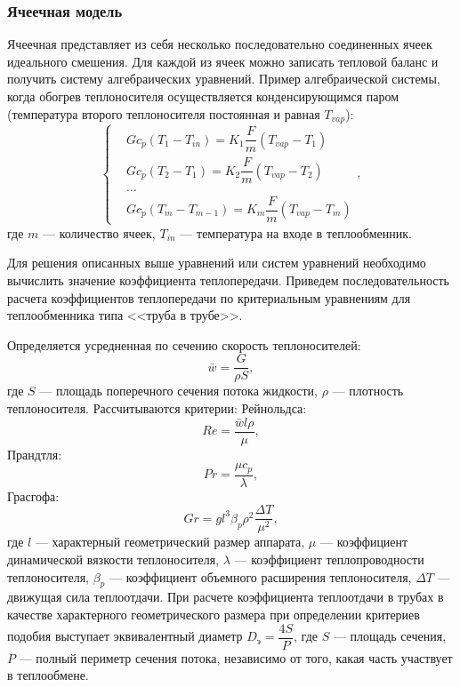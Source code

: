 \subsubsection*{Ячеечная модель}
Ячеечная представляет из себя несколько последовательно соединенных ячеек идеального смешения. Для каждой из ячеек можно записать тепловой баланс и получить систему алгебраических уравнений. Пример алгебраической системы, когда обогрев теплоносителя осуществляется конденсирующимся паром (температура второго теплоносителя постоянная и равная $T_{vap}$):
 \begin{equation}\label{eq:tep.yam}
\left\{
\begin{aligned}
&G c_p ( T_{1} - T_{in} ) = K_1 \dfrac {F} {m} ( T_{vap} - T_{1} )        \\
&G c_p ( T_{2} - T_{1} ) = K_2 \dfrac {F} {m} ( T_{vap} - T_{2} )	\\
& ... \\
&G c_p ( T_{m} - T_{m-1} ) = K_m \dfrac {F} {m} ( T_{vap} - T_{m} )           
\end{aligned}
\right. ,
\end{equation}
где $m$ --- количество ячеек, $T_{in}$ --- температура на входе в теплообменник.


Для решения описанных выше уравнений или систем уравнений необходимо вычислить значение коэффициента теплопередачи. Приведем последовательность расчета коэффициентов теплопередачи по критериальным уравнениям для теплообменника типа <<труба в трубе>>.

Определяется усредненная по сечению скорость теплоносителей:
\begin{equation}
	\bar{w} = \dfrac{ G}{\rho S},
\end{equation}
где $S$ --- площадь поперечного сечения потока жидкости, $\rho$ --- плотность теплоносителя.
Рассчитываются критерии:
Рейнольдса:
\begin{equation} \label{eq.tepl.re}
Re=\dfrac{\bar{w} l \rho}{\mu},
\end{equation}
Прандтля:
\begin{equation} \label{eq.tepl.pr}
Pr=\dfrac{\mu c_p}{\lambda},
\end{equation}
Грасгофа:
\begin{equation}
Gr= g l^3 \beta_p \rho^2 \dfrac{\Delta T}{\mu^2},
\end{equation}
где $l$ --- характерный геометрический размер аппарата, $\mu$ --- коэффициент динамической вязкости теплоносителя, $\lambda$ --- коэффициент теплопроводности теплоносителя, $\beta_p$ --- коэффициент объемного расширения теплоносителя, $\Delta T$ --- движущая сила теплоотдачи. При расчете коэффициента теплоотдачи в трубах в качестве характерного геометрического размера при определении критериев подобия выступает эквивалентный диаметр $D_э=\dfrac{4S}{P}$, где $S$ --- площадь сечения, $P$ --- полный периметр сечения потока, независимо от того, какая часть участвует в теплообмене.

